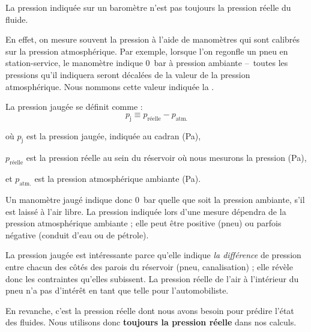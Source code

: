 		
		La pression indiquée sur un baromètre n’est pas toujours la pression réelle du fluide.
		
		En effet, on mesure souvent la pression à l’aide de manomètres qui sont calibrés sur la pression atmosphérique. Par exemple, lorsque l’on regonfle un pneu en station-service, le manomètre indique \SI{0}{\bar} à pression ambiante --\ toutes les pressions qu’il indiquera seront décalées de la valeur de la pression atmosphérique. Nous nommons cette valeur indiquée la \textbf{}.

		La pression jaugée se définit comme :
		\begin{equation*}
		p_{\text{j}} \equiv  p_{\text{réelle}} - p_{\text{atm.}}
		\end{equation*}
		
		\begin{equationterms}
			\item où \tab $p_{\text{j}}$ 		\tab\tab\tab\tab est la pression jaugée, indiquée au cadran (\si{\pascal}),
			\item \tab $p_{\text{réelle}}$ 	\tab est la pression réelle au sein du réservoir où nous mesurons la pression (\si{\pascal}),
			\item et \tab $p_{\text{atm.}}$ 	\tab\tab est la pression atmosphérique ambiante (\si{\pascal}).
		\end{equationterms}

		Un manomètre jaugé indique donc \SI{0}{\bar} quelle que soit la pression ambiante, s’il est laissé à l’air libre. La pression indiquée lors d’une mesure dépendra de la pression atmosphérique ambiante ; elle peut être positive (pneu) ou parfois négative (conduit d’eau ou de pétrole).
		
		La pression jaugée est intéressante parce qu’elle indique \emph{la différence} de pression entre chacun des côtés des parois du réservoir (pneu, canalisation) ; elle révèle donc les contraintes qu’elles subissent. La pression réelle de l’air à l’intérieur du pneu n’a pas d’intérêt en tant que telle pour l’automobiliste.

		En revanche, c’est la pression réelle dont nous avons besoin pour prédire l’état des fluides. Nous utilisons donc \textbf{toujours la pression réelle} dans nos calculs.
